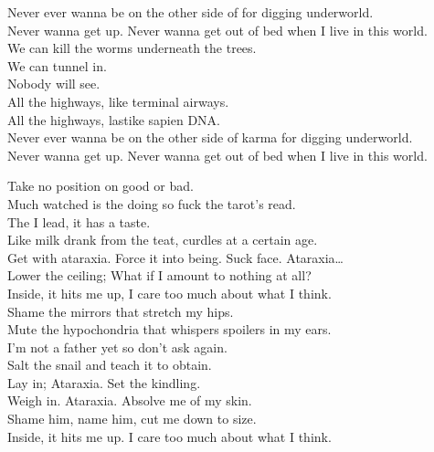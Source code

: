 Never ever wanna be on the other side of  for digging underworld. \\
Never wanna get up. Never wanna get out of bed when I live in this world. \\

We can kill the worms underneath the trees. \\
We can tunnel in. \\
Nobody will see. \\

All the highways, like terminal airways. \\
All the highways, lastike sapien DNA. \\

Never ever wanna be on the other side of karma for digging underworld. \\
Never wanna get up. Never wanna get out of bed when I live in this world. \\




Take no position on good or bad. \\
Much watched is the doing so fuck the tarot's read. \\
The  I lead, it has a taste. \\
Like milk drank from the teat, curdles at a certain age. \\

Get with ataraxia. Force it into being. Suck face. Ataraxia… \\
Lower the ceiling; What if I amount to nothing at all? \\
Inside, it hits me up, I care too much about what I think. \\

Shame the mirrors that stretch my hips. \\
Mute the hypochondria that whispers spoilers in my ears. \\
I'm not a father yet so don't ask again. \\
Salt the snail and teach it to obtain. \\

Lay in; Ataraxia. Set the kindling. \\
Weigh in. Ataraxia. Absolve me of my skin. \\
Shame him, name him, cut me down to size. \\
Inside, it hits me up. I care too much about what I think. \\

